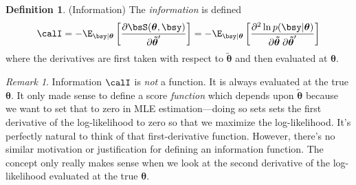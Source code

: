 \documentclass[12pt]{article}
\theoremstyle{plain}
\theoremstyle{definition}
\newtheorem{defn}[thm]{Definition}
\theoremstyle{remark}
\newtheorem*{rmk}{Remark}
\newcommand{\bstheta}{\boldsymbol{\theta}}
\newcommand{\bstildetheta}{\boldsymbol{\tilde{\theta}}}
\begin{document}
\begin{defn}(Information)
The \emph{information} is defined
\begin{align*}
  \calI
  =
  -\E_{\bsy|\bstheta}\left[
    \frac{\partial \bsS(\bstheta,\bsy)}{\partial \bstildetheta'}
  \right]
  =
  -\E_{\bsy|\bstheta}\left[
    \frac{\partial^2 \ln p(\bsy|\bstheta)}{%
      \partial\bstildetheta\;\partial\bstildetheta'}
  \right]
\end{align*}
where the derivatives are first taken with respect to $\bstildetheta$
and then evaluated at $\bstheta$.
\end{defn}
\begin{rmk}
Information $\calI$ is \emph{not} a function. It is always evaluated at
the true $\bstheta$. It only made sense to define a score
\emph{function} which depends upon $\bstildetheta$ because we want to
set that to zero in MLE estimation---doing so sets sets the first
derivative of the log-likelihood to zero so that we maximize the
log-likelihood. It's perfectly natural to think of that first-derivative
function. However, there's no similar motivation or justification for
defining an information function.  The concept only really makes sense
when we look at the second derivative of the log-likelihood evaluated at
the true $\bstheta$.
\end{rmk}
\end{document}

